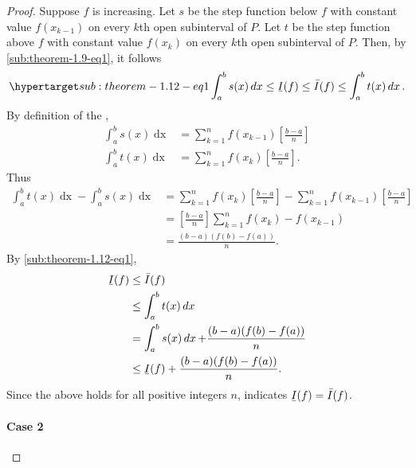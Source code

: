 \documentclass{report}
\begin{document}
\begin{proof}
      Suppose $f$ is increasing.
      Let $s$ be the step function below $f$ with constant value $f(x_{k-1})$
        on every $k$th open subinterval of $P$.
      Let $t$ be the step function above $f$ with constant value $f(x_k)$
        on every $k$th open subinterval of $P$.
      Then, by \eqref{sub:theorem-1.9-eq1}, it follows
        \begin{equation}
          \hyperlabel{sub:theorem-1.12-eq1}
          \int_a^b s(x) \mathop{dx} \leq \ubar{I}(f)
            \leq \bar{I}(f) \leq \int_a^b t(x) \mathop{dx}.
        \end{equation}
      By definition of the ,
        \begin{align*}
          \int_a^b s(x) \mathop{dx}
            & = \sum_{k=1}^n f(x_{k-1})\left[\frac{b - a}{n}\right] \\
          \int_a^b t(x) \mathop{dx}
            & = \sum_{k=1}^n f(x_k)\left[\frac{b - a}{n}\right].
        \end{align*}
      Thus
        \begin{align*}
          \int_a^b t(x) \mathop{dx} - \int_a^b s(x) \mathop{dx}
            & = \sum_{k=1}^n f(x_k)\left[\frac{b - a}{n}\right] -
                \sum_{k=1}^n f(x_{k-1})\left[\frac{b - a}{n}\right] \\
            & = \left[\frac{b - a}{n}\right] \sum_{k=1}^n f(x_k) - f(x_{k-1}) \\
            & = \frac{(b - a)(f(b) - f(a))}{n}.
        \end{align*}
      By \eqref{sub:theorem-1.12-eq1},
        \begin{align*}
          \ubar{I}(f)
            & \leq \bar{I}(f) \\
            & \leq \int_a^b t(x) \mathop{dx} \\
            & = \int_a^b s(x) \mathop{dx} + \frac{(b - a)(f(b) - f(a))}{n} \\
            & \leq \ubar{I}(f) + \frac{(b - a)(f(b) - f(a))}{n}.
        \end{align*}
      Since the above holds for all positive integers $n$,
         indicates $\ubar{I}(f) = \bar{I}(f)$.

    \paragraph{Case 2}%


\end{proof}
\end{document}
